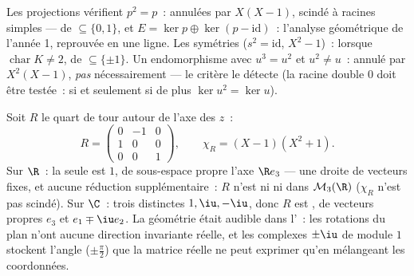 \begin{example}\label{ex:b2:reduction:projections}
Les projections vérifient $p^2 = p$~: annulées par $X(X-1)$, scindé à
racines simples ---  de  $\subseteq \{0, 1\}$,
et $E = \ker p \oplus \ker(p - \mathrm{id})$~: l'analyse géométrique
de l'année 1, reprouvée en une ligne. Les symétries ($s^2 =
\mathrm{id}$,  $X^2 - 1$)~:  lorsque
$\operatorname{char} K \neq 2$, de  $\subseteq \{\pm 1\}$. Un
endomorphisme avec $u^3 = u^2$ et $u^2 \neq u$~: annulé par $X^2(X -
1)$, \emph{pas} nécessairement  --- le critère le
détecte (la racine double $0$ doit être testée~:  si et
seulement si de plus $\ker u^2 = \ker u$).
\end{example}

\begin{example}\label{ex:b2:reduction:rotation3d}
Soit $R$ le quart de tour autour de l'axe des $z$~:
\[
R = \begin{pmatrix}
0 & -1 & 0\\
1 & 0 & 0\\
0 & 0 & 1
\end{pmatrix},
\qquad
\chi_R = (X - 1)(X^2 + 1).
\]
Sur $\R$~: la seule  est $1$, de sous-espace propre
l'axe $\R e_3$ --- une droite de vecteurs fixes, et aucune réduction
supplémentaire~: $R$ n'est ni  ni  dans
$\mathcal{M}_3(\R)$ ($\chi_R$ n'est pas scindé). Sur $\C$~: trois
 distinctes $1, \iu, -\iu$, donc $R$ est
, de vecteurs propres $e_3$ et $e_1 \mp \iu e_2$. La
géométrie était audible dans l'~: les rotations du plan n'ont
aucune direction invariante réelle, et les  complexes
$\pm\iu$ de module $1$ stockent l'angle ($\pm\frac\pi2$) que la
matrice réelle ne peut exprimer qu'en mélangeant les coordonnées.
\end{example}

